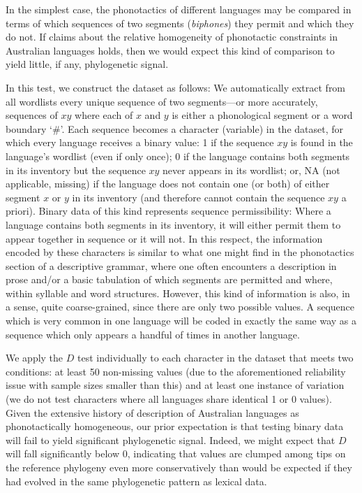 In the simplest case, the phonotactics of different languages may be compared in terms of which sequences of two segments (\emph{biphones}) they permit and which they do not. If claims about the relative homogeneity of phonotactic constraints in Australian languages holds, then we would expect this kind of comparison to yield little, if any, phylogenetic signal.

In this test, we construct the dataset as follows: We automatically extract from all wordlists every unique sequence of two segments---or more accurately, sequences of \(xy\) where each of \(x\) and \(y\) is either a phonological segment or a word boundary `\#'. Each sequence becomes a character (variable) in the dataset, for which every language receives a binary value: 1 if the sequence \(xy\) is found in the language's wordlist (even if only once); 0 if the language contains both segments in its inventory but the sequence \(xy\) never appears in its wordlist; or, NA (not applicable, missing) if the language does not contain one (or both) of either segment \(x\) or \(y\) in its inventory (and therefore cannot contain the sequence \(xy\) a priori). Binary data of this kind represents sequence permissibility: Where a language contains both segments in its inventory, it will either permit them to appear together in sequence or it will not. In this respect, the information encoded by these characters is similar to what one might find in the phonotactics section of a descriptive grammar, where one often encounters a description in prose and/or a basic tabulation of which segments are permitted and where, within syllable and word structures. However, this kind of information is also, in a sense, quite coarse-grained, since there are only two possible values. A sequence which is very common in one language will be coded in exactly the same way as a sequence which only appears a handful of times in another language.

We apply the \(D\) test individually to each character in the dataset that meets two conditions: at least 50 non-missing values (due to the aforementioned reliability issue with sample sizes smaller than this) and at least one instance of variation (we do not test characters where all languages share identical 1 or 0 values). Given the extensive history of description of Australian languages as phonotactically homogeneous, our prior expectation is that testing binary data will fail to yield significant phylogenetic signal. Indeed, we might expect that \(D\) will fall significantly below 0, indicating that values are clumped among tips on the reference phylogeny even more conservatively than would be expected if they had evolved in the same phylogenetic pattern as lexical data.

